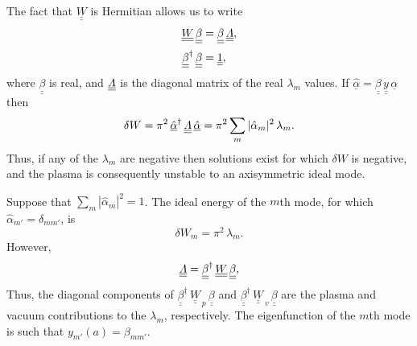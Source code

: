 \documentclass[12pt,prb,aps,notitlepage]{revtex4-1}
\begin{document}
The fact that $\underline{\underline{W}}$ is Hermitian allows us to write
\begin{align}
\underline{\underline{W}}\,\underline{\underline{\beta}} &= \underline{\underline{\beta}}\,\underline{\underline{\mit\Lambda}},\\[0.5ex]
\underline{\underline{\beta}}^\dag\,\underline{\underline{\beta}} &= \underline{\underline{1}},
\end{align}
where $\underline{\underline{\beta}}$ is real, and $\underline{\underline{\mit\Lambda}}$ is the diagonal matrix of the real $\lambda_m$ values. 
If $\underline{\hat{\alpha}}= \underline{\underline{\beta}}\,\underline{\underline{y}}\,\underline{\alpha}$ then
\begin{equation}
\delta W =\pi^2\,\underline{\hat{\alpha}}^\dag\,\underline{\underline{\mit\Lambda}}\,\underline{\hat{\alpha}}=\pi^2\sum_m|\hat{\alpha}_m|^2\,\lambda_m.
\end{equation}
Thus, if any of the $\lambda_m$ are negative then solutions exist for which $\delta W$ is negative, and the plasma is consequently unstable to
an axisymmetric ideal mode. 

Suppose that $\sum_{m}|\hat{\alpha}_m|^2=1$. The ideal energy of the $m$th mode,
for which $\hat{\alpha}_{m'} = \delta_{mm'}$,  is
\begin{equation}
\delta W_m = \pi^2\,\lambda_m.
\end{equation}
However,
\begin{equation}
\underline{\underline{\mit\Lambda}} = \underline{\underline{\beta}}^\dag\,\underline{\underline{W}}\,\underline{\underline{\beta}},
\end{equation}
Thus, the diagonal components of $\underline{\underline{\beta}}^\dag\,\underline{\underline{W}}_{\,p}\,\underline{\underline{\beta}}$ 
and $\underline{\underline{\beta}}^\dag\,\underline{\underline{W}}_{\,v}\,\underline{\underline{\beta}}$  are the plasma and vacuum
contributions to the $\lambda_m$, respectively. The eigenfunction of the $m$th mode is such that $y_{m'}(a)= \beta_{mm'}$. 
\end{document}
